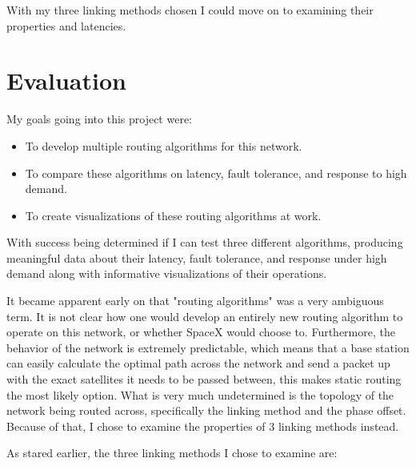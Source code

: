 \documentclass[12pt]{report}
\begin{document}
With my three linking methods chosen I could move on to examining their properties and latencies.

\chapter{Evaluation}

My goals going into this project were:

\begin{itemize}
\item To develop multiple routing algorithms for this network.
\item To compare these algorithms on latency, fault tolerance, and response to high demand.
\item To create visualizations of these routing algorithms at work.
\end{itemize}

With success being determined if I can test three different algorithms, producing meaningful data about their latency, fault tolerance, and response under high demand along with informative visualizations of their operations. 

It became apparent early on that "routing algorithms" was a very ambiguous term. It is not clear how one would develop an entirely new routing algorithm to operate on this network, or whether SpaceX would choose to. Furthermore, the behavior of the network is extremely predictable, which means that a base station can easily calculate the optimal path across the network and send a packet up with the exact satellites it needs to be passed between, this makes static routing the most likely option. What is very much undetermined is the topology of the network being routed across, specifically the linking method and the phase offset. Because of that, I chose to examine the properties of 3 linking methods instead.

As stared earlier, the three linking methods I chose to examine are:
\end{document}

